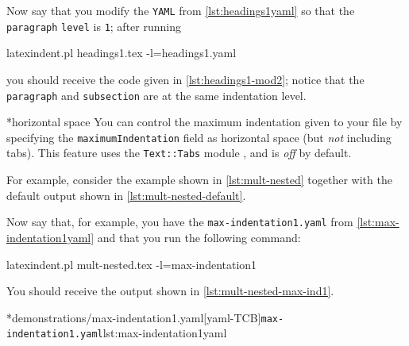 	Now say that you modify the \texttt{YAML} from \cref{lst:headings1yaml} so that the \texttt{paragraph} \texttt{level} is \texttt{1}; after running \begin{commandshell}
latexindent.pl headings1.tex -l=headings1.yaml
\end{commandshell} you should receive the code given in \cref{lst:headings1-mod2}; notice that the \texttt{paragraph} and \texttt{subsection} are at the same indentation level.

*{horizontal space}
	You can control the maximum indentation given to your file by%
	 specifying the \texttt{maximumIndentation} field as horizontal space (but \emph{not} including tabs).
	This feature uses the \texttt{Text::Tabs} module \cite{texttabs}, and is \emph{off} by default.

	For example, consider the example shown in \cref{lst:mult-nested} together with the default output shown in \cref{lst:mult-nested-default}.

	\begin{minipage}{.45\textwidth}
	\end{minipage}%
	\hfill
	\begin{minipage}{.45\textwidth}
	\end{minipage}

	Now say that, for example, you have the \texttt{max-indentation1.yaml} from \cref{lst:max-indentation1yaml} and that you run the following command: \begin{commandshell}
latexindent.pl mult-nested.tex -l=max-indentation1
    \end{commandshell} You should receive the output shown in \cref{lst:mult-nested-max-ind1}.

	\begin{minipage}{.45\textwidth}
		\cmhlistingsfromfile[style=yaml-LST]*{demonstrations/max-indentation1.yaml}[yaml-TCB]{\texttt{max-indentation1.yaml}}{lst:max-indentation1yaml}
	\end{minipage}%
	\hfill
	\begin{minipage}{.45\textwidth}
	\end{minipage}

